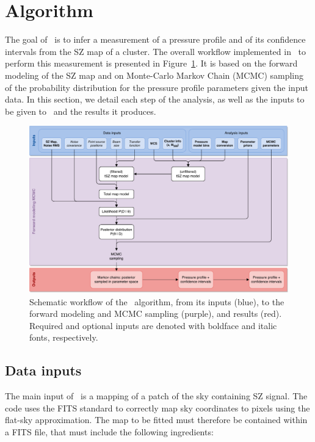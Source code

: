 \section{Algorithm} \label{sec:algo}

The goal of \panco\ is to infer a measurement of a pressure profile and of its confidence intervals from the SZ map of a cluster.
The overall workflow implemented in \panco\ to perform this measurement is presented in Figure~\ref{fig:workflow}.
It is based on the forward modeling of the SZ map and on Monte-Carlo Markov Chain (MCMC) sampling of the probability distribution for the pressure profile parameters given the input data.
In this section, we detail each step of the analysis, as well as the inputs to be given to \panco\ and the results it produces.

\begin{figure}[htp]
    \centering
    \includegraphics[width=.9\linewidth]{Figures/workflow.drawio.pdf}
    \caption{
        Schematic workflow of the \panco\ algorithm, from its inputs (blue), to the forward modeling and MCMC sampling (purple), and results (red).
        Required and optional inputs are denoted with boldface and italic fonts, respectively.
    }
    \label{fig:workflow}
\end{figure}

\subsection{Data inputs} \label{sec:algo:inputs}

The main input of \panco\ is a mapping of a patch of the sky containing SZ signal.
The code uses the FITS standard \citep{wells_fits_1981} to correctly map sky coordinates to pixels using the flat-sky approximation.
The map to be fitted must therefore be contained within a FITS file, that must include the following ingredients:


